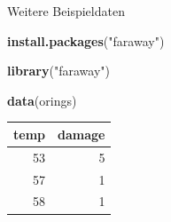 \documentclass[ignorenonframetext,]{beamer}
\newenvironment{Shaded}{}{}
\newcommand{\KeywordTok}[1]{\textcolor[rgb]{0.00,0.44,0.13}{\textbf{{#1}}}}
\newcommand{\StringTok}[1]{\textcolor[rgb]{0.25,0.44,0.63}{{#1}}}
\newcommand{\NormalTok}[1]{{#1}}
\begin{document}
\begin{frame}[fragile]{Weitere Beispieldaten}

\begin{Shaded}
\begin{Highlighting}[]
\KeywordTok{install.packages}\NormalTok{(}\StringTok{"faraway"}\NormalTok{)}
\end{Highlighting}
\end{Shaded}

\begin{Shaded}
\begin{Highlighting}[]
\KeywordTok{library}\NormalTok{(}\StringTok{"faraway"}\NormalTok{)}
\end{Highlighting}
\end{Shaded}

\begin{Shaded}
\begin{Highlighting}[]
\KeywordTok{data}\NormalTok{(orings)}
\end{Highlighting}
\end{Shaded}

\begin{longtable}[]{@{}rr@{}}
\toprule
temp & damage\tabularnewline
\midrule
\endhead
53 & 5\tabularnewline
57 & 1\tabularnewline
58 & 1\tabularnewline
\bottomrule
\end{longtable}

\end{frame}
\end{document}
